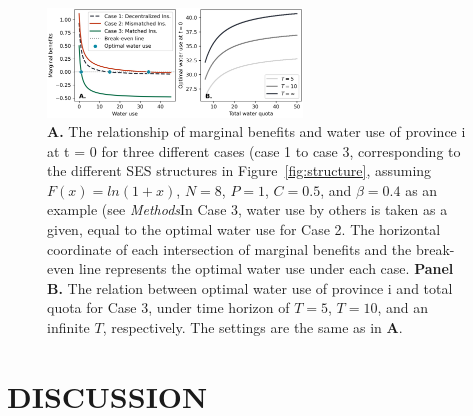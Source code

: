 \documentclass{nsr}
\begin{document}
\begin{figure}[!ht]
    \centering
    \includegraphics[width=16pc]{../../../figs/outputs/economic_model.jpg}
	\caption{
		\textbf{A.} The relationship of marginal benefits and water use of province i at t = 0 for three different cases (case 1 to case 3, corresponding to the different SES structures in Figure~\ref{fig:structure}, assuming $F(x)=ln(1+x)$, $N=8$, $P=1$, $C=0.5$, and $\beta=0.4$ as an example  (see \textit{Methods}In Case 3, water use by others is taken as a given, equal to the optimal water use for Case 2. The horizontal coordinate of each intersection of marginal benefits and the break-even line represents the optimal water use under each case.
		\textbf{Panel B.} The relation between optimal water use of province i and total quota for Case 3, under time horizon of $T=5$, $T=10$, and an infinite $T$, respectively. The settings are the same as in \textbf{A}.
	}
	\label{fig:economic_model}
\end{figure}

\section{DISCUSSION}\label{discussion}

\end{document}
